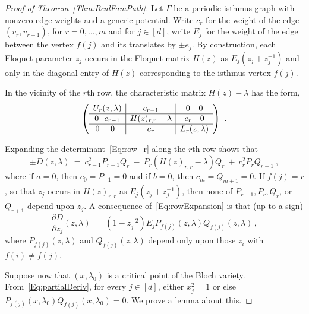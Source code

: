 \documentclass[12pt]{amsart}
\theoremstyle{remark}
\newcommand{\defcolor}[1]{{\color{blue}#1}}
\begin{document}
\begin{proof}[Proof of Theorem~\ref{Thm:RealFamPath}]
  Let $\Gamma$ be a periodic isthmus graph with nonzero edge weights and a generic potential.
  Write \defcolor{$c_r$} for the weight of the edge $(v_r,v_{r+1})$, for $r=0,\dotsc,m$ and for $j\in[d]$, write
  \defcolor{$E_j$} for the weight of the edge between the vertex $f(j)$ and its translates by $\pm e_j$.
  By construction, each Floquet parameter $z_j$ occurs in the Floquet matrix $H(z)$ as $E_j(z_j+z_j^{-1})$ and only in
  the diagonal entry of $H(z)$ corresponding to the isthmus vertex $f(j)$.

 
  In the vicinity of the $r$th row, the characteristic matrix $H(z)-\lambda$ has the form,
  \begin{equation}\label{Eq:row_r}
  \left( \begin{array}{c|c|c}
        U_r(z,\lambda)  &     c_{r-1}        & 0\hspace{.5pt}\quad 0 \\\hline
        0\ \  c_{r-1}& H(z)_{r,r}-\lambda & c_r \quad 0 \\\hline
        0\ \quad {0\hspace{5.5pt}}      &      c_r        &  L_r(z,\lambda) \end{array}\right)\ .
  \end{equation}

  Expanding the determinant~\eqref{Eq:row_r} along the $r$th row shows that
   \begin{equation}\label{Eq:rowExpansion}
  \pm D(z,\lambda)\ =\
  c_{r-1}^2 P_{r-1}Q_r \ -\ P_r (H(z)_{r,r}-\lambda)Q_r\ +\ c_r^2 P_r Q_{r+1}\ ,
  \end{equation}
  where if $a=0$, then $c_0=P_{-1}=0$ and if $b=0$, then $c_m=Q_{m+1}=0$.
  If $f(j)=r$, so that $z_j$ occurs in $H(z)_{r,r}$  as $E_j(z_j+ z_j^{-1})$, then none of
  $P_{r-1},P_r,Q_r$, or $Q_{r+1}$ depend upon $z_j$.
  A consequence of~\eqref{Eq:rowExpansion} is that (up to a sign) 
  \begin{equation}\label{Eq:partialDeriv}
     \frac{\partial D}{\partial z_j}(z,\lambda)\ =\
      (1-z_j^{-2}) E_j P_{f(j)}(z,\lambda)Q_{f(j)}(z,\lambda)\,,
  \end{equation}
  where  $P_{f(j)}(z,\lambda)$ and $Q_{f(j)}(z,\lambda)$ depend only upon those $z_i$ with $f(i)\neq f(j)$.

  Suppose now that \defcolor{$(x,\lambda_0)$} is a critical point of the Bloch variety.
  From~\eqref{Eq:partialDeriv}, for every $j\in[d]$, either $x_j^2=1$ or else $P_{f(j)}(x,\lambda_0) Q_{f(j)}(x,\lambda_0)=0$.
  We prove a lemma about this.


\end{proof}
\end{document}
